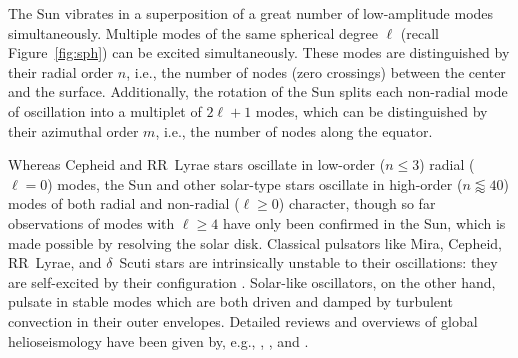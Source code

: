 The Sun vibrates in a superposition of a great number of low-amplitude modes simultaneously. 
Multiple modes of the same spherical degree $\ell$ (recall Figure~\ref{fig:sph}) can be excited simultaneously. 
These modes are distinguished by their radial order $n$, i.e., the number of nodes (zero crossings) between the center and the surface. 
Additionally, the rotation of the Sun splits each non-radial mode of oscillation into a multiplet of ${2\ell+1}$ modes, which can be distinguished by their azimuthal order $m$, i.e., the number of nodes along the equator. 

Whereas Cepheid and RR~Lyrae stars oscillate in low-order (${n\leq 3}$) radial (${\ell = 0}$) modes, the Sun and other solar-type stars oscillate in high-order (${n\lessapprox 40}$) modes of both radial and non-radial (${\ell\geq 0}$) character, though so far observations of modes with $\ell \geq 4$ have only been confirmed in the Sun, which is made possible by resolving the solar disk. 
Classical pulsators like Mira, Cepheid, RR~Lyrae, and $\delta$~Scuti stars are intrinsically unstable to their oscillations: they are self-excited by their configuration \citep[e.g.,][]{2015EAS....73..111S}. 
Solar-like oscillators, on the other hand, pulsate in stable modes which are both driven and damped by turbulent convection in their outer envelopes. 
Detailed reviews and overviews of global helioseismology have been given by, e.g., \citet{2002RvMP...74.1073C}, \citet{Kosovichev1999,2011lnp...832....3k}, and \citet{2016lrsp...13....2b}. 

